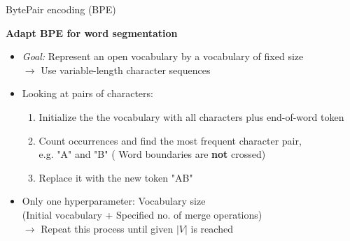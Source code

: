 \documentclass[]{beamer}
\newcommand\warning{%
 \makebox[1.4em][c]{%
 \makebox[0pt][c]{\raisebox{.1em}{\scriptsize!}}%
 \makebox[0pt][c]{\color{red}\normalsize$\bigtriangleup$}}}%
\begin{document}
\begin{frame}{BytePair encoding (BPE)}

	\textbf{Adapt BPE for word segmentation \href{https://www.aclweb.org/anthology/P16-1162.pdf}{}}

	\begin{itemize}
		\item \textit{Goal:} Represent an open vocabulary by a vocabulary of fixed size\\
					$\rightarrow$ Use variable-length character sequences 
		\item Looking at pairs of characters:
			\begin{enumerate}
				\item Initialize the the vocabulary with all characters plus end-of-word token
				\item Count occurrences and find the most frequent character pair,\\
							e.g. "A" and "B" (\warning Word boundaries are \textbf{not} crossed)
				\item Replace it with the new token "AB"
			\end{enumerate}
		\item Only one hyperparameter: Vocabulary size\\
					(Initial vocabulary + Specified no. of merge operations)\\
					$\rightarrow$ Repeat this process until given $|V|$ is reached
	\end{itemize}
\end{frame}
\end{document}
